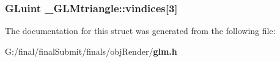 \subsubsection[{vindices}]{\setlength{\rightskip}{0pt plus 5cm}G\-Luint \-\_\-\-G\-L\-Mtriangle\-::vindices[3]}\label{struct___g_l_mtriangle_a261d6913421550571727e596ba883738}


The documentation for this struct was generated from the following file\-:\begin{DoxyCompactItemize}
\item 
G\-:/final/final\-Submit/finals/obj\-Render/{\bf glm.\-h}\end{DoxyCompactItemize}
